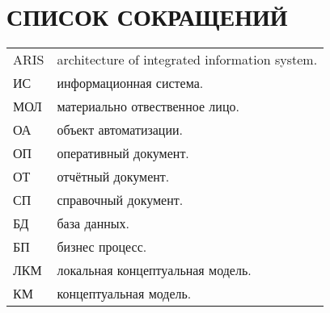 {}
\section*{СПИСОК СОКРАЩЕНИЙ}

\begin{tabular}{ll} 
    ARIS    & architecture of integrated information system.\\
    ИС      & информационная система.\\
    МОЛ     & материально отвественное лицо.\\
    ОА      & объект автоматизации.\\
    ОП      & оперативный документ.\\
    ОТ      & отчётный документ.\\
    СП      & справочный документ.\\
    БД      & база данных.\\
    БП      & бизнес процесс.\\
    ЛКМ     & локальная концептуальная модель.\\ 
    КМ      & концептуальная модель.\\
\end{tabular}

\newpage
